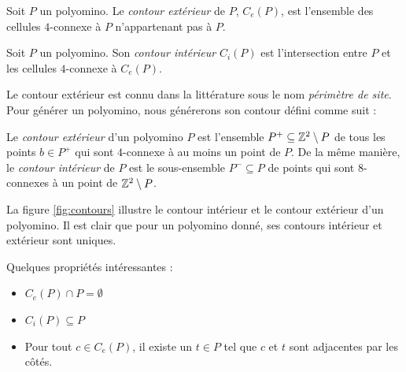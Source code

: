 \begin{definition}
Soit $P$ un polyomino. Le \emph{contour extérieur} de $P$, $C_e(P)$, est l'ensemble des cellules $4$-connexe à $P$ n'appartenant pas à $P$.
\end{definition}

\begin{definition}
Soit $P$ un polyomino. Son \emph{contour intérieur} $C_i(P)$ est l'intersection entre $P$ et les cellules $4$-connexe à $C_e(P)$.
\end{definition}

Le contour extérieur est connu dans la littérature sous le nom \emph{périmètre de site}. %
Pour générer un polyomino, nous générerons son contour défini comme suit \cite{MBM03,Sieben08}  : 

\begin{definition}\label{def:contours}
Le \emph{contour extérieur} d'un polyomino $P$ est l'ensemble $P^+\subseteq\mathbb{Z}^2 \setminus P$ de tous les points $b \in P^+$ qui sont $4$-connexe à au moins un point de $P$. De la même manière, le \emph{contour intérieur} de $P$ est le sous-ensemble $P^-\subseteq P$ de points qui sont $8$-connexes à un point de $\mathbb{Z}^2\setminus P$.
\end{definition}


La figure \ref{fig:contours} illustre le contour intérieur et le contour extérieur d'un polyomino. Il est clair que pour un polyomino donné, ses contours intérieur et extérieur sont uniques.



Quelques propriétés intéressantes :
\renewcommand{\labelitemi}{$\bullet$}
\begin{itemize}
\item $C_e(P) \cap P = \emptyset$
\item $C_i(P) \subseteq P$
\item Pour tout $c \in C_e(P)$, il existe un $t \in P$ tel que $c$ et $t$ sont adjacentes par les côtés.
\end{itemize}




